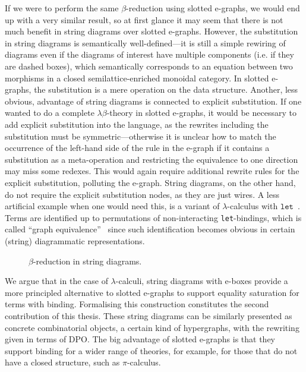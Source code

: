 If we were to perform the same $\beta$-reduction using slotted e-graphs, we would end up with a very similar result, so at first glance it may seem that there is not much benefit in string diagrams over slotted e-graphs.
However, the substitution in string diagrams is semantically well-defined---it is still a simple rewiring of diagrams even if the diagrams of interest have multiple components (i.e. if they are dashed boxes), which semantically corresponds to an equation between two morphisms in a closed semilattice-enriched monoidal category.
In slotted e-graphs, the substitution is a mere operation on the data structure.
Another, less obvious, advantage of string diagrams is connected to explicit substitution.
If one wanted to do a complete $\lambda\beta$-theory in slotted e-graphs, it would be necessary to add explicit substitution into the language, as the rewrites including the substitution must be symmetric---otherwise it is unclear how to match the occurrence of the left-hand side of the rule in the e-graph if it contains a substitution as a meta-operation and restricting the equivalence to one direction may miss some redexes.
This would again require additional rewrite rules for the explicit substitution, polluting the e-graph.
String diagrams, on the other hand, do not require the explicit substitution nodes, as they are just wires.
A less artificial example when one would need this, is a variant of $\lambda$-calculus with $\texttt{let}$~\cite{AbadiExplicitSubst, anf}.
Terms are identified up to permutations of non-interacting \texttt{let}-bindings, which is called \enquote{graph equivalence}~\cite{accattoli2014nonstandard} since such identification becomes obvious in certain (string) diagrammatic representations.
\begin{figure}
    \centering
    \caption{$\beta$-reduction in string diagrams.}
    \label{fig:beta-reduction-string-diagrams}    
\end{figure}
We argue that in the case of $\lambda$-calculi, string diagrams with e-boxes provide a more principled alternative to slotted e-graphs to support equality saturation for terms with binding.
Formalising this construction constitutes the second contribution of this thesis.
These string diagrams can be similarly presented as concrete combinatorial objects, a certain kind of hypergraphs, with the rewriting given in terms of DPO.
The big advantage of slotted e-graphs is that they support binding for a wider range of theories, for example, for those that do not have a closed structure, such as $\pi$-calculus.
